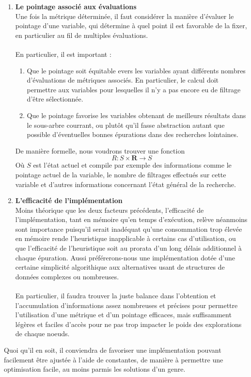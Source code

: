 \documentclass{article}
\begin{document}
\begin{enumerate}
\item \textbf{Le pointage associé aux évaluations \\}
Une fois la métrique déterminée, il faut considérer la manière d'évaluer le
pointage d'une variable, qui détermine à quel point il est favorable de la
fixer, en particulier au fil de multiples évaluations. \\
\\
En particulier, il est important :
\begin{enumerate}
\item Que le pointage soit équitable evers les variables ayant différents
nombres d'évaluations de métriques associés. En particulier, le calcul doit
permettre aux variables pour lesquelles il n'y a pas encore eu de filtrage
d'être sélectionnée.
\item Que le pointage favorise les variables obtenant de meilleurs résultats
dans le sous-arbre courrant, ou plutôt qu'il fasse abstraction autant que 
possible d'éventuelles bonnes épurations dans des recherches lointaines.
\end{enumerate}

De manière formelle, nous voudrons trouver une fonction
\[ R: S \times \mathbf{R} \to S \]
Où $S$ est l'état actuel et compile par exemple des informations comme le
pointage actuel de la variable, le nombre de filtrages effectués sur cette
variable et d'autres informations concernant l'état général de la recherche.

\item \textbf{L'efficacité de l'implémentation \\}
Moins théorique que les deux facteurs précédents, l'efficacité de 
l'implémentation, tant en mémoire qu'en temps d'exécution, relève néanmoins
sont importance puisqu'il serait inadéquat qu'une consommation trop élevée
en mémoire rende l'heuristique inapplicable à certains cas d'utilisation,
ou que l'efficacité de l'heuristique soit au prorata d'un long délais 
additionnel à chaque épuration. Aussi préférerons-nous une implémentation
dotée d'une certaine simplicité algorithique aux alternatives usant de
structures de données complexes ou nombreuses. \\
\\
En particulier, il faudra trouver la juste balance dans l'obtention et 
l'accumulation d'informations assez nombreuses et précises pour 
permettre l'utilisation d'une métrique et d'un pointage efficaces, mais
suffisamment légères et faciles d'accès pour ne pas trop impacter le 
poids des explorations de chaque noeuds.
\end{enumerate}
Quoi qu'il en soit, il conviendra de favoriser une implémentation pouvant
facilement être ajustée à l'aide de constantes, de manière à permettre une
optimisation facile, au moins parmis les solutions d'un genre.
\end{document}

